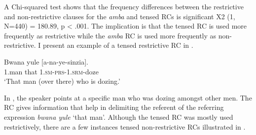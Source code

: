 \documentclass[output=paper,colorlinks,citecolor=brown]{langscibook}
\begin{document}

A Chi-squared test shows that the frequency differences between the restrictive and non-restrictive clauses for the \textit{amba} and tensed RCs is significant X2 (1, N=440) = 180.89, p < .001. The implication is that the tensed RC is used more frequently as restrictive while the \textit{amba} RC is used more frequently as non-restrictive. I present an example of a tensed restrictive RC in .

\ea%
    \label{ex:mwamzandi:14}
    \gll    Bwana yule [a-na-ye-sinzia].\\
            1.man  that  \textsc{1.sm-prs-1.srm-}doze\\
    \glt    ‘That man (over there) who is dozing.’
\z

In , the speaker points at a specific man who was dozing amongst other men. The RC gives information that help in delimiting the referent of the referring expression \textit{bwana yule} ‘that man’. Although the tensed RC was mostly used restrictively, there are a few instances tensed non-restrictive RCs illustrated in .
\end{document}
